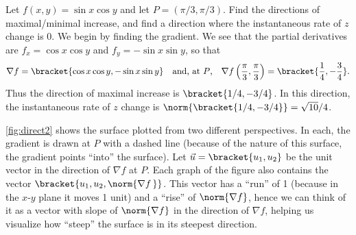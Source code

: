 \begin{example}\label{ex_direct2}
Let $f(x,y) = \sin x\cos y$ and let $P=(\pi/3,\pi/3)$. Find the directions of maximal/minimal increase, and find a direction where the instantaneous rate of $z$ change is 0.
\solution
We begin by finding the gradient. We see that the partial derivatives are $f_x = \cos x\cos y$ and $f_y = -\sin x\sin y$, so that
\[\nabla f =\bracket{\cos x\cos y,-\sin x\sin y}\quad \text{and, at $P$,} \quad \nabla f\left(\frac{\pi}3,\frac{\pi}3\right) =\bracket{\frac14,-\frac34}.\]
Thus the direction of maximal increase is $\bracket{1/4, -3/4}$. In this direction, the instantaneous rate of $z$ change is $\norm{\bracket{1/4,-3/4}} = \sqrt{10}/4%
$. 


\autoref{fig:direct2} shows the surface plotted from two different perspectives. In each, the gradient is drawn at $P$ with a dashed line (because of the nature of this surface, the gradient points ``into'' the surface). Let $\vec u =\bracket{u_1, u_2}$ be the unit vector in the direction of $\nabla f$ at $P$. Each graph of the figure also contains the vector $\bracket{u_1, u_2, \norm{\nabla f\,}}$. This vector has a ``run'' of 1 (because in the $x$-$y$ plane it moves 1 unit) and a ``rise'' of $\norm{\nabla f}$, hence we can think of it as a vector with slope of $\norm{\nabla f}$ in the direction of $\nabla f$, helping us visualize how ``steep'' the surface is in its steepest direction. 


\end{example}

